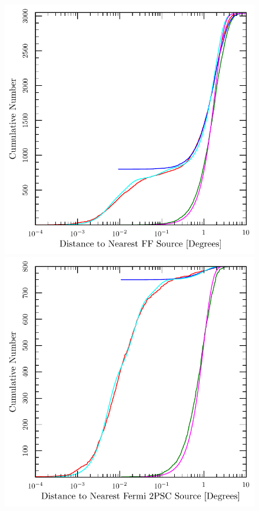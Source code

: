 \documentclass[useAMS,usenatbib]{mn2e}
\begin{document}
\begin{figure}
\includegraphics[width=\columnwidth]{cumfermi.pdf}
\includegraphics[width=\columnwidth]{cumff.pdf}


\end{figure}
\end{document}
